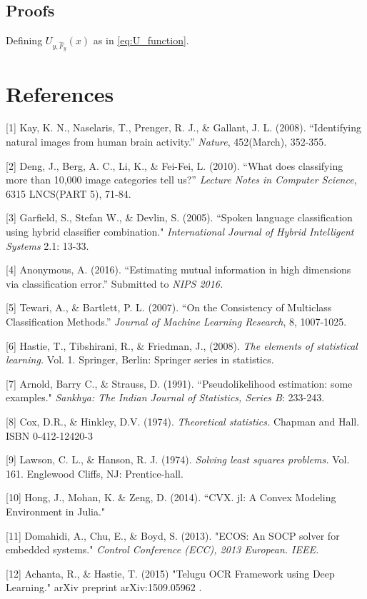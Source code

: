\documentclass[12pt]{article}
\begin{document}
\subsection{Proofs}

\begin{lemma}\label{lemma:U_function}
Defining $U_{y,\hat{F}_y}(x)$ as in \eqref{eq:U_function}.
\end{lemma}



\section*{References}

\small

[1] Kay, K. N., Naselaris, T., Prenger, R. J., \& Gallant, J. L. (2008). ``Identifying natural images from human brain activity.'' 
\emph{Nature}, 452(March), 352-355.

[2] Deng, J., Berg, A. C., Li, K., \& Fei-Fei, L. (2010). ``What does classifying more than 10,000 image categories tell us?'' \emph{Lecture Notes in Computer Science}, 6315 LNCS(PART 5), 71-84. 

[3] Garfield, S., Stefan W., \& Devlin, S. (2005). ``Spoken language classification using hybrid classifier combination." 
\emph{International Journal of Hybrid Intelligent Systems} 2.1: 13-33.

[4] Anonymous, A. (2016). ``Estimating mutual information in high dimensions via classification error.''  Submitted to 
\emph{NIPS 2016.}

[5] Tewari, A., \& Bartlett, P. L. (2007). ``On the Consistency of Multiclass Classification Methods.''
\emph{Journal of Machine Learning Research}, 8, 1007-1025.

[6] Hastie, T., Tibshirani, R., \& Friedman, J., (2008). \emph{The elements
of statistical learning.} Vol. 1. Springer, Berlin: Springer series in
statistics.

[7] Arnold, Barry C., \& Strauss, D.  (1991). ``Pseudolikelihood estimation: some examples." \emph{Sankhya: The Indian Journal of Statistics, Series B}: 233-243.

[8] Cox, D.R., \& Hinkley, D.V. (1974). \emph{Theoretical statistics.} Chapman and Hall. ISBN 0-412-12420-3

[9] Lawson, C. L., \& Hanson, R. J. (1974). \emph{Solving least squares problems.} Vol. 161. Englewood Cliffs, NJ: Prentice-hall.

[10] Hong, J., Mohan, K. \& Zeng, D. (2014). ``CVX. jl: A Convex Modeling Environment in Julia."

[11] Domahidi, A., Chu, E., \& Boyd, S. (2013). "ECOS: An SOCP solver for embedded systems." \emph{Control Conference (ECC), 2013 European. IEEE.}

[12] Achanta, R., \& Hastie, T. (2015) "Telugu OCR Framework using Deep Learning." arXiv preprint arXiv:1509.05962 .
\end{document}

